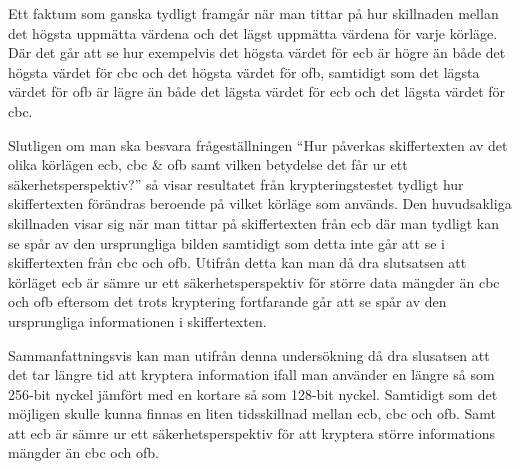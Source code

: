 Ett faktum som ganska tydligt framgår när man tittar på hur skillnaden mellan det högsta uppmätta värdena och det lägst uppmätta värdena för varje körläge. Där det går att se hur
exempelvis det högsta värdet för \acrshort{ecb} är högre än både det högsta värdet för \acrshort{cbc} och det högsta värdet för \acrshort{ofb}, samtidigt som det lägsta värdet för
\acrshort{ofb} är lägre än både det lägsta värdet för \acrshort{ecb} och det lägsta värdet för \acrshort{cbc}.

Slutligen om man ska besvara frågeställningen “Hur påverkas skiffertexten av det olika körlägen \acrshort{ecb}, \acrshort{cbc} \& \acrshort{ofb} samt vilken betydelse det får ur ett säkerhetsperspektiv?”
så visar resultatet från krypteringstestet tydligt hur skiffertexten förändras beroende på vilket körläge som används. Den huvudsakliga skillnaden visar sig när man tittar på skiffertexten
från \acrshort{ecb} där man tydligt kan se spår av den ursprungliga bilden samtidigt som detta inte går att se i skiffertexten från \acrshort{cbc} och \acrshort{ofb}. Utifrån detta kan man då dra slutsatsen
att körläget \acrshort{ecb} är sämre ur ett säkerhetsperspektiv för större data mängder än \acrshort{cbc} och \acrshort{ofb} eftersom det trots kryptering fortfarande går att se spår av den ursprungliga
informationen i skiffertexten.

Sammanfattningsvis kan man utifrån denna undersökning då dra slusatsen att det tar längre tid att kryptera information ifall man använder en längre så som 256-bit nyckel jämfört med en kortare så som 128-bit nyckel. Samtidigt
som det möjligen skulle kunna finnas en liten tidsskillnad mellan \acrshort{ecb}, \acrshort{cbc} och \acrshort{ofb}. Samt att \acrshort{ecb} är sämre ur ett säkerhetsperspektiv för att kryptera större informations mängder än
\acrshort{cbc} och \acrshort{ofb}.
